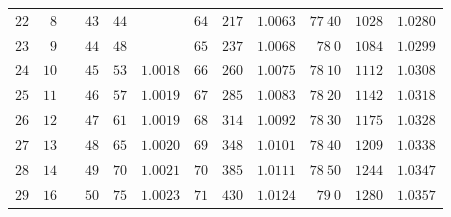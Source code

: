 \begin{center}
{{\begin{minipage}[t][500pt][t]{.96\linewidth}
{\begin{tabular}{r|r|r||r|r|r||r|r|r||r|r|r}
$22$ & $8$ &  & $43$ & $44$ &  & $64$ & $217$ & $1.0063$ & $77\ 40$ & $1028$ & $1.0280$\\
$23$ & $9$ &  & $44$ & $48$ &  & $65$ & $237$ & $1.0068$ & $78\ 0$ & $1084$ & $1.0299$\\
$24$ & $10$ &  & $45$ & $53$ & $1.0018$ & $66$ & $260$ & $1.0075$ & $78\ 10$ & $1112$ & $1.0308$\\
$25$ & $11$ &  & $46$ & $57$ & $1.0019$ & $67$ & $285$ & $1.0083$ & $78\ 20$ & $1142$ & $1.0318$\\
$26$ & $12$ &  & $47$ & $61$ & $1.0019$ & $68$ & $314$ & $1.0092$ & $78\ 30$ & $1175$ & $1.0328$\\
$27$ & $13$ &  & $48$ & $65$ & $1.0020$ & $69$ & $348$ & $1.0101$ & $78\ 40$ & $1209$ & $1.0338$\\
$28$ & $14$ &  & $49$ & $70$ & $1.0021$ & $70$ & $385$ & $1.0111$ & $78\ 50$ & $1244$ & $1.0347$\\
$29$ & $16$ &  & $50$ & $75$ & $1.0023$ & $71$ & $430$ & $1.0124$ & $79\ 0$ & $1280$ & $1.0357$
\end{tabular}}
\end{minipage}}}\endgroup
\end{center}
